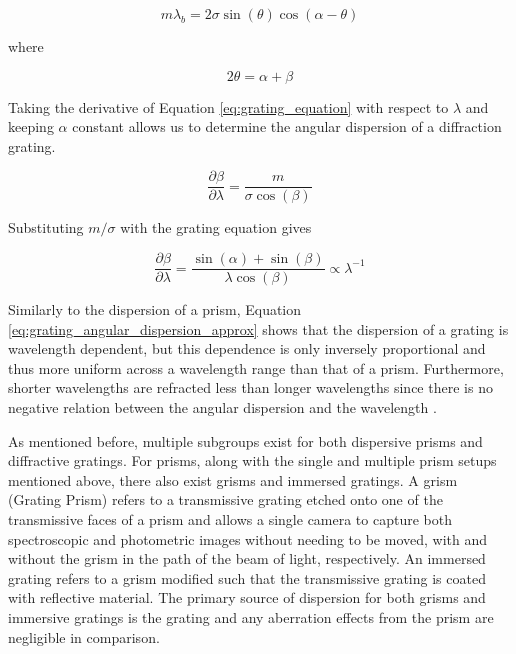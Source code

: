 \begin{equation}
    m\lambda_{b} = 2\sigma\sin(\theta)\cos(\alpha - \theta)
    \label{eq:blaze_wavelength}
\end{equation}

\noindent where

\begin{equation}
    2\theta = \alpha + \beta
\end{equation}

Taking the derivative of Equation \ref{eq:grating_equation} with respect to $\lambda$ and keeping $\alpha$ constant allows us to determine the angular dispersion of a diffraction grating.

\begin{equation}
    \frac{\partial \beta}{\partial \lambda} = \frac{m}{\sigma \cos(\beta)}
    \label{eq:grating_angular_dispersion}
\end{equation}

\noindent Substituting $m / \sigma$ with the grating equation gives

\begin{equation}
    \frac{\partial \beta}{\partial \lambda} = \frac{\sin(\alpha) + \sin(\beta)}{\lambda \cos(\beta)} \propto \lambda^{-1}
    \label{eq:grating_angular_dispersion_approx}
\end{equation}

Similarly to the dispersion of a prism, Equation \ref{eq:grating_angular_dispersion_approx} shows that the dispersion of a grating is wavelength dependent, but this dependence is only inversely proportional and thus more uniform across a wavelength range than that of a prism. Furthermore, shorter wavelengths are refracted less than longer wavelengths since there is no negative relation between the angular dispersion and the wavelength \citep{BirneyObsAstro, Hecht_optics}.
\prgph

As mentioned before, multiple subgroups exist for both dispersive prisms and diffractive gratings. For prisms, along with the single and multiple prism setups mentioned above, there also exist grisms and immersed gratings. A grism (Grating Prism) refers to a transmissive grating etched onto one of the transmissive faces of a prism and allows a single camera to capture both spectroscopic and photometric images without needing to be moved, with and without the grism in the path of the beam of light, respectively. An immersed grating refers to a grism modified such that the transmissive grating is coated with reflective material. The primary source of dispersion for both grisms and immersive gratings is the grating and any aberration effects from the prism are negligible in comparison.
\prgph

